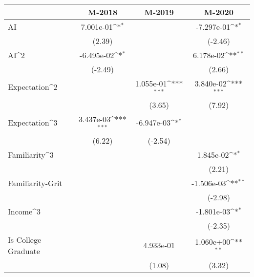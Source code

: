 {
\def\sym#1{\ifmmode^{#1}\else\(^{#1}\)\fi}
\begin{tabular}{l*{3}{c}}
    \toprule
                              & M-2018             & M-2019             & M-2020                   \\
    \midrule
    AI                        & 7.001e-01\sym{*}   &                    & -7.297e-01\sym{*}        \\
                              & (2.39)             &                    & (-2.46)                  \\
    \addlinespace
    AI^2                      & -6.495e-02\sym{*}  &                    & 6.178e-02\sym{**}        \\
                              & (-2.49)            &                    & (2.66)                   \\
    \addlinespace
    Expectation^2             &                    & 1.055e-01\sym{***} & 3.840e-02\sym{***}       \\
                              &                    & (3.65)             & (7.92)                   \\
    \addlinespace
    Expectation^3             & 3.437e-03\sym{***} & -6.947e-03\sym{*}  &                          \\
                              & (6.22)             & (-2.54)            &                          \\
    \addlinespace
    Familiarity^3             &                    &                    & 1.845e-02\sym{*}         \\
                              &                    &                    & (2.21)                   \\
    \addlinespace
    Familiarity-Grit          &                    &                    & -1.506e-03\sym{**}       \\
                              &                    &                    & (-2.98)                  \\
    \addlinespace
    Income^3                  &                    &                    & -1.801e-03\sym{*}        \\
                              &                    &                    & (-2.35)                  \\
    \addlinespace
    Is College Graduate       &                    & 4.933e-01          & 1.060e+00\sym{**}        \\
                              &                    & (1.08)             & (3.32)                   \\

\end{tabular}}
